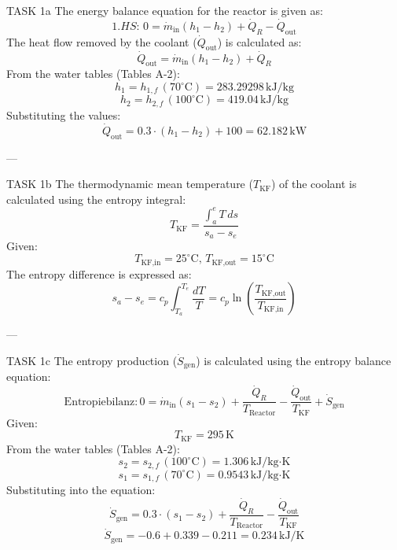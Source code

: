 TASK 1a  
The energy balance equation for the reactor is given as:  
\[
1. HS: \, 0 = \dot{m}_{\text{in}} (h_1 - h_2) + \dot{Q}_R - \dot{Q}_{\text{out}}
\]  
The heat flow removed by the coolant (\( \dot{Q}_{\text{out}} \)) is calculated as:  
\[
\dot{Q}_{\text{out}} = \dot{m}_{\text{in}} (h_1 - h_2) + \dot{Q}_R
\]  
From the water tables (Tables A-2):  
\[
h_1 = h_{1,f} \, (70^\circ\text{C}) = 283.29298 \, \text{kJ/kg}
\]  
\[
h_2 = h_{2,f} \, (100^\circ\text{C}) = 419.04 \, \text{kJ/kg}
\]  
Substituting the values:  
\[
\dot{Q}_{\text{out}} = 0.3 \cdot (h_1 - h_2) + 100 = 62.182 \, \text{kW}
\]  

---

TASK 1b  
The thermodynamic mean temperature (\( T_{\text{KF}} \)) of the coolant is calculated using the entropy integral:  
\[
T_{\text{KF}} = \frac{\int_{a}^{e} T \, ds}{s_a - s_e}
\]  
Given:  
\[
T_{\text{KF,in}} = 25^\circ\text{C}, \, T_{\text{KF,out}} = 15^\circ\text{C}
\]  
The entropy difference is expressed as:  
\[
s_a - s_e = c_p \int_{T_a}^{T_e} \frac{dT}{T} = c_p \ln \left( \frac{T_{\text{KF,out}}}{T_{\text{KF,in}}} \right)
\]  

---

TASK 1c  
The entropy production (\( \dot{S}_{\text{gen}} \)) is calculated using the entropy balance equation:  
\[
\text{Entropiebilanz:} \, 0 = \dot{m}_{\text{in}} (s_1 - s_2) + \frac{\dot{Q}_R}{T_{\text{Reactor}}} - \frac{\dot{Q}_{\text{out}}}{T_{\text{KF}}} + \dot{S}_{\text{gen}}
\]  
Given:  
\[
T_{\text{KF}} = 295 \, \text{K}
\]  
From the water tables (Tables A-2):  
\[
s_2 = s_{2,f} \, (100^\circ\text{C}) = 1.306 \, \text{kJ/kg·K}
\]  
\[
s_1 = s_{1,f} \, (70^\circ\text{C}) = 0.9543 \, \text{kJ/kg·K}
\]  
Substituting into the equation:  
\[
\dot{S}_{\text{gen}} = 0.3 \cdot (s_1 - s_2) + \frac{\dot{Q}_R}{T_{\text{Reactor}}} - \frac{\dot{Q}_{\text{out}}}{T_{\text{KF}}}
\]  
\[
\dot{S}_{\text{gen}} = -0.6 + 0.339 - 0.211 = 0.234 \, \text{kJ/K}
\]